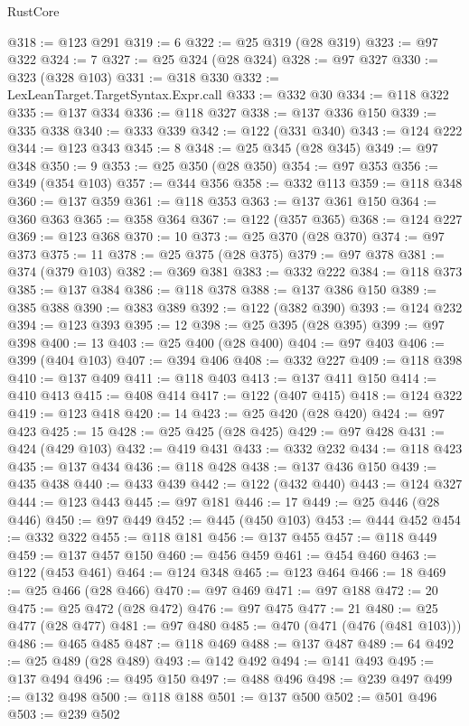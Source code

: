 \begin{lexlean}{RustCore}
\begin{coremodule}
@318 := @123 @291
@319 := 6
@322 := @25 @319 (@28 @319)
@323 := @97 @322
@324 := 7
@327 := @25 @324 (@28 @324)
@328 := @97 @327
@330 := @323 (@328 @103)
@331 := @318 @330
@332 := LexLeanTarget.TargetSyntax.Expr.call
@333 := @332 @30
@334 := @118 @322
@335 := @137 @334
@336 := @118 @327
@338 := @137 @336 @150
@339 := @335 @338
@340 := @333 @339
@342 := @122 (@331 @340)
@343 := @124 @222
@344 := @123 @343
@345 := 8
@348 := @25 @345 (@28 @345)
@349 := @97 @348
@350 := 9
@353 := @25 @350 (@28 @350)
@354 := @97 @353
@356 := @349 (@354 @103)
@357 := @344 @356
@358 := @332 @113
@359 := @118 @348
@360 := @137 @359
@361 := @118 @353
@363 := @137 @361 @150
@364 := @360 @363
@365 := @358 @364
@367 := @122 (@357 @365)
@368 := @124 @227
@369 := @123 @368
@370 := 10
@373 := @25 @370 (@28 @370)
@374 := @97 @373
@375 := 11
@378 := @25 @375 (@28 @375)
@379 := @97 @378
@381 := @374 (@379 @103)
@382 := @369 @381
@383 := @332 @222
@384 := @118 @373
@385 := @137 @384
@386 := @118 @378
@388 := @137 @386 @150
@389 := @385 @388
@390 := @383 @389
@392 := @122 (@382 @390)
@393 := @124 @232
@394 := @123 @393
@395 := 12
@398 := @25 @395 (@28 @395)
@399 := @97 @398
@400 := 13
@403 := @25 @400 (@28 @400)
@404 := @97 @403
@406 := @399 (@404 @103)
@407 := @394 @406
@408 := @332 @227
@409 := @118 @398
@410 := @137 @409
@411 := @118 @403
@413 := @137 @411 @150
@414 := @410 @413
@415 := @408 @414
@417 := @122 (@407 @415)
@418 := @124 @322
@419 := @123 @418
@420 := 14
@423 := @25 @420 (@28 @420)
@424 := @97 @423
@425 := 15
@428 := @25 @425 (@28 @425)
@429 := @97 @428
@431 := @424 (@429 @103)
@432 := @419 @431
@433 := @332 @232
@434 := @118 @423
@435 := @137 @434
@436 := @118 @428
@438 := @137 @436 @150
@439 := @435 @438
@440 := @433 @439
@442 := @122 (@432 @440)
@443 := @124 @327
@444 := @123 @443
@445 := @97 @181
@446 := 17
@449 := @25 @446 (@28 @446)
@450 := @97 @449
@452 := @445 (@450 @103)
@453 := @444 @452
@454 := @332 @322
@455 := @118 @181
@456 := @137 @455
@457 := @118 @449
@459 := @137 @457 @150
@460 := @456 @459
@461 := @454 @460
@463 := @122 (@453 @461)
@464 := @124 @348
@465 := @123 @464
@466 := 18
@469 := @25 @466 (@28 @466)
@470 := @97 @469
@471 := @97 @188
@472 := 20
@475 := @25 @472 (@28 @472)
@476 := @97 @475
@477 := 21
@480 := @25 @477 (@28 @477)
@481 := @97 @480
@485 := @470 (@471 (@476 (@481 @103)))
@486 := @465 @485
@487 := @118 @469
@488 := @137 @487
@489 := 64
@492 := @25 @489 (@28 @489)
@493 := @142 @492
@494 := @141 @493
@495 := @137 @494
@496 := @495 @150
@497 := @488 @496
@498 := @239 @497
@499 := @132 @498
@500 := @118 @188
@501 := @137 @500
@502 := @501 @496
@503 := @239 @502

\end{coremodule}
\end{lexlean}
